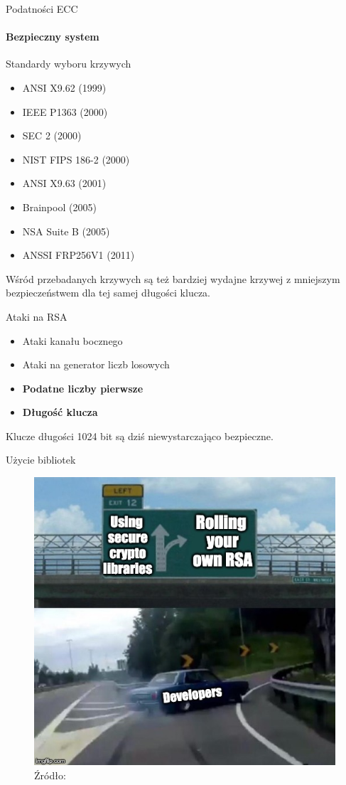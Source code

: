 \begin{frame}{Podatności ECC}
    \framesubtitle{Bezpieczny system}
    Standardy wyboru krzywych \cite{SafeCurves}
    \begin{scriptsize}
        \begin{itemize}
            \item ANSI X9.62 (1999)
            \item IEEE P1363 (2000)
            \item SEC 2 (2000)
            \item NIST FIPS 186-2 (2000)
            \item ANSI X9.63 (2001)
            \item Brainpool (2005)
            \item NSA Suite B (2005)
            \item ANSSI FRP256V1 (2011)
        \end{itemize}
    \end{scriptsize}
    \pause
    \vspace{3mm}
    Wśród przebadanych krzywych są też bardziej wydajne krzywej z mniejszym bezpieczeństwem dla tej samej długości klucza. \cite{PracticalCryptographyForDevelopers}
\end{frame}

\begin{frame}{Ataki na RSA}
\begin{itemize}
    \item Ataki kanału bocznego
    \item Ataki na generator liczb losowych
    \pause
    \item \textbf{Podatne liczby pierwsze}
    \pause
    \item \textbf{Długość klucza}
\end{itemize}
Klucze długości 1024 bit są dziś niewystarczająco bezpieczne.
\end{frame}

\begin{frame}{Użycie bibliotek}
\pause
\begin{figure}
    \centering
        \includegraphics[height=0.55\textwidth]{security/graphics/developer-implements-rsa-car-meme}
        \caption{Źródło: \cite{SeriouslyStopUsingRsa}}
\end{figure}
\end{frame}

